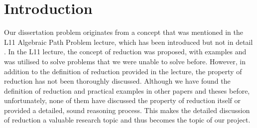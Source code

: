 \documentclass[a4paper,12pt,twoside,openright]{report}
\begin{document}
\pagestyle{empty}
\singlespacing
%
%
%

\setcounter{page}{0}
\pagestyle{plain}
\tableofcontents
\listoffigures


\renewcommand{\lstlistlistingname}{List of Listings}
%
%

\onehalfspacing


\chapter{Introduction}
\setcounter{page}{1} 

%
%

Our dissertation problem originates from a concept that was mentioned in the L11 Algebraic Path Problem lecture, which has been introduced but not in detail \cite{griffin_2017}.  In the L11 lecture, the concept of reduction was proposed, with examples and was utilised to solve problems that we were unable to solve before. However, in addition to the definition of reduction provided in the lecture, the property of reduction has not been thoroughly discussed. Although we have found the definition of reduction and practical examples in other papers and theses before, unfortunately, none of them have discussed the property of reduction itself or provided a detailed, sound reasoning process.  This makes the detailed discussion of reduction a valuable research topic and thus becomes the topic of our project.
\end{document}
